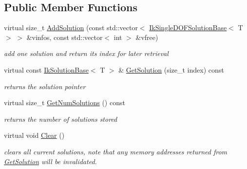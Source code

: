 \subsection*{Public Member Functions}
\begin{DoxyCompactItemize}
\item 
virtual size\-\_\-t \hyperlink{classikfast_1_1IkSolutionList_ac0a503b13e68403e7b2d92afd4c28a7b}{Add\-Solution} (const std\-::vector$<$ \hyperlink{classikfast_1_1IkSingleDOFSolutionBase}{Ik\-Single\-D\-O\-F\-Solution\-Base}$<$ T $>$ $>$ \&vinfos, const std\-::vector$<$ int $>$ \&vfree)
\begin{DoxyCompactList}\small\item\em add one solution and return its index for later retrieval \end{DoxyCompactList}\item 
\hypertarget{classikfast_1_1IkSolutionList_ab2840cca4cea5547d684907047d38bba}{virtual const \hyperlink{classikfast_1_1IkSolutionBase}{Ik\-Solution\-Base}$<$ T $>$ \& \hyperlink{classikfast_1_1IkSolutionList_ab2840cca4cea5547d684907047d38bba}{Get\-Solution} (size\-\_\-t index) const }\label{classikfast_1_1IkSolutionList_ab2840cca4cea5547d684907047d38bba}

\begin{DoxyCompactList}\small\item\em returns the solution pointer \end{DoxyCompactList}\item 
\hypertarget{classikfast_1_1IkSolutionList_a4508235ea7738ee067d6525a34362567}{virtual size\-\_\-t \hyperlink{classikfast_1_1IkSolutionList_a4508235ea7738ee067d6525a34362567}{Get\-Num\-Solutions} () const }\label{classikfast_1_1IkSolutionList_a4508235ea7738ee067d6525a34362567}

\begin{DoxyCompactList}\small\item\em returns the number of solutions stored \end{DoxyCompactList}\item 
\hypertarget{classikfast_1_1IkSolutionList_ae341a33d5aee644cac867e3edd2a9916}{virtual void \hyperlink{classikfast_1_1IkSolutionList_ae341a33d5aee644cac867e3edd2a9916}{Clear} ()}\label{classikfast_1_1IkSolutionList_ae341a33d5aee644cac867e3edd2a9916}

\begin{DoxyCompactList}\small\item\em clears all current solutions, note that any memory addresses returned from \hyperlink{classikfast_1_1IkSolutionList_ab2840cca4cea5547d684907047d38bba}{Get\-Solution} will be invalidated. \end{DoxyCompactList}\end{DoxyCompactItemize}
